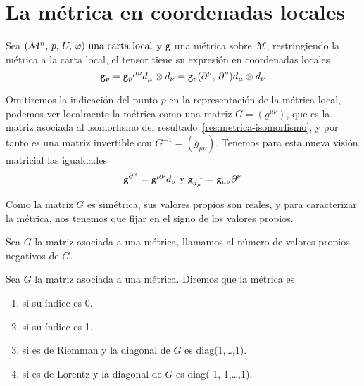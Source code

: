 \section{La métrica en coordenadas locales}\label{sec:metrica-coordenadas-locales}
Sea $(\mathcal{M}^n,\thinspace p,\thinspace U,\thinspace \varphi)\textmd{ una carta local}$ y $\mathsf{g}$ una métrica sobre $\mathcal{M}$, restringiendo la métrica a la carta local, el tensor tiene su expresión en coordenadas locales
\begin{equation}
	\label{eq:metrica-base-local}
	\mathsf{g}_p = {\mathsf{g}_p}^{\mu\nu}d_{\mu}\otimes d_{\nu}=\mathsf{g}_p(\partial^\mu,\thinspace\partial^\nu)d_{\mu}\otimes d_{\nu}
\end{equation}

Omitiremos la indicación del punto $p$ en la representación de la métrica local, podemos ver localmente la métrica como
una matriz $G=(g^{\mu\nu})$, que es la matriz asociada al isomorfismo del
resultado~\ref{res:metrica-isomorfismo}, y por tanto es una matriz invertible con $G^{-1}=(g_{\mu\nu})$.
Tenemos para esta nueva visión matricial las igualdades
\begin{equation}
	\label{eq:metrica-matriz-isomorfismo}
     \mathsf{g}^{\partial^\mu}=\mathsf{g}^{\mu\nu}d_{\nu}\text{ y }\mathsf{g}^{-1}_{d_\mu}=\mathsf{g}_{\mu\nu}\partial^{\nu}
\end{equation}

Como la matriz $G$ es simétrica, sus valores propios son reales, y para caracterizar la métrica, nos tenemos que
fijar en el signo de los valores propios.

\begin{definition}
	Sea $G$ la matriz asociada a una métrica, llamamos  al
	número de valores propios negativos de $G$.
\end{definition}

\begin{definition}
	Sea $G$ la matriz asociada a una métrica. Diremos que la métrica es
	\begin{enumerate}
		\item {} si su índice es 0.
		\item {} si su índice es 1.
		\item {} si es de Riemman y la diagonal de $G$ es diag(1,\ldots,1).
		\item {} si es de Lorentz y la diagonal de $G$ es diag(-1, 1,\ldots,1).
	\end{enumerate}
\end{definition}


